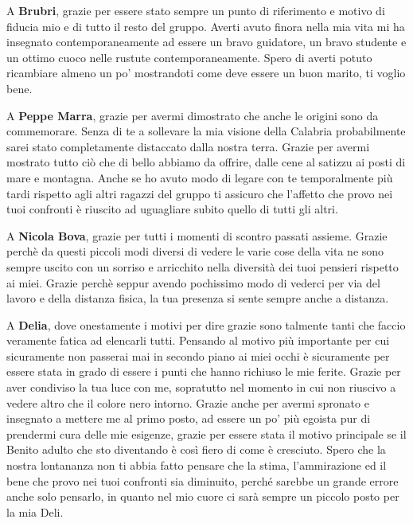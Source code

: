 \documentclass[cucitura%
,12pt%
]{toptesi}
\begin{document}
A \textbf{Brubri}, grazie per essere stato sempre un punto di riferimento e motivo di fiducia mio e di tutto il resto del gruppo. Averti avuto finora nella mia vita mi ha insegnato contemporaneamente ad essere un bravo guidatore,
un bravo studente e un ottimo cuoco nelle rustute contemporaneamente. Spero di averti potuto ricambiare almeno un po’ mostrandoti come deve essere un buon marito, ti voglio bene.

A \textbf{Peppe Marra}, grazie per avermi dimostrato che anche le origini sono da commemorare. Senza di te a sollevare la mia visione della Calabria probabilmente sarei stato completamente distaccato dalla nostra terra. Grazie per
avermi mostrato tutto ciò che di bello abbiamo da offrire, dalle cene al satizzu ai posti di mare e montagna. Anche se ho avuto modo di legare con te temporalmente più tardi rispetto agli altri ragazzi del gruppo ti assicuro che l'affetto
che provo nei tuoi confronti è riuscito ad uguagliare subito quello di tutti gli altri.

A \textbf{Nicola Bova}, grazie per tutti i momenti di scontro passati assieme. Grazie perchè da questi piccoli modi diversi di vedere le varie cose della vita ne sono sempre uscito con un sorriso e arricchito nella diversità dei tuoi pensieri rispetto ai miei.
Grazie perchè seppur avendo pochissimo modo di vederci per via del lavoro e della distanza fisica, la tua presenza si sente sempre anche a distanza.

A \textbf{Delia}, dove onestamente i motivi per dire grazie sono talmente tanti che faccio veramente fatica ad elencarli tutti. Pensando al motivo più importante per cui sicuramente non passerai mai in secondo piano ai miei occhi è 
sicuramente per essere stata in grado di essere i punti che hanno richiuso le mie ferite. Grazie per aver condiviso la tua luce con me, sopratutto nel momento in cui non riuscivo a vedere altro che il colore nero intorno. 
Grazie anche per avermi spronato e insegnato a mettere me al primo posto, ad essere un po’ più egoista pur di prendermi cura delle mie esigenze, grazie per essere stata il motivo principale se il Benito adulto che sto diventando è così fiero di come è cresciuto. 
Spero che la nostra lontananza non ti abbia fatto pensare che la stima, l’ammirazione ed il bene che provo nei tuoi confronti sia diminuito, perché sarebbe un grande errore anche solo pensarlo, in quanto nel mio cuore ci sarà sempre un piccolo posto per la mia Deli.
\end{document}
